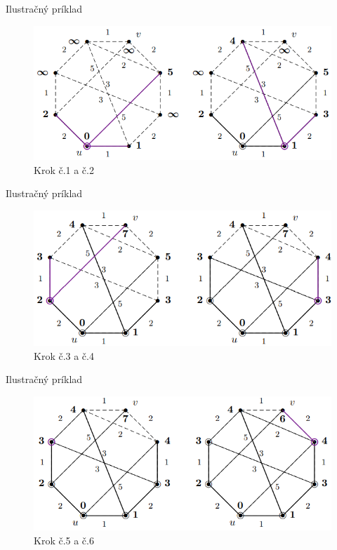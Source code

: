 \documentclass[15pt]{beamer}
\begin{document}
\begin{frame}{Ilustračný príklad}
	\begin{figure}
		\centering
		\includegraphics{imgs/dijkstra2.png}
		\caption{Krok č.1 a č.2}
		\label{fig:dijkstra2}
	\end{figure}
\end{frame}

\begin{frame}{Ilustračný príklad}
	\begin{figure}
		\centering
		\includegraphics{imgs/dijkstra3.png}
		\caption{Krok č.3 a č.4}
		\label{fig:dijkstra3}
	\end{figure}
\end{frame}

\begin{frame}{Ilustračný príklad}
	\begin{figure}
		\centering
		\includegraphics{imgs/dijkstra4.png}
		\caption{Krok č.5 a č.6}
		\label{fig:dijkstra4}
	\end{figure}
\end{frame}
\end{document}
